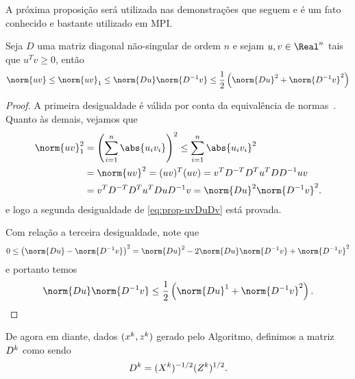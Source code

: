 
A próxima proposição será utilizada nas demonstrações que seguem e é um fato conhecido e bastante utilizado em \ac{MPI}.

\begin{prop}\label{prop:norm-uv}
	Seja $D$ uma matriz diagonal não-singular de ordem $n$ e sejam $u,v\in\Real^n$ tais que $u^Tv\geq0$, então 
	\begin{equation}
		\label{eq:prop-uvDuDv}
		\norm{uv}\leq \norm{uv}_1 \leq \norm{Du}\norm{D^{-1}v} \leq \frac{1}{2}\left(\norm{Du}^{2} + \norm{D^{-1}v}^{2}\right)
	\end{equation}
\end{prop}
\begin{proof} A primeira desigualdade é válida por conta da equivalência de normas~\cite[p.~53]{Golub:1996wp}. Quanto às demais, vejamos que 
\[
	\begin{aligned}
		\norm{uv}_1^{2} & = \left( \sum_{i=1}^{n}\abs{u_i v_i}  \right)^{2} \leq  \sum_{i=1}^{n}\abs{u_iv_i}^{2}\\
						& = \norm{uv}^{2} = (uv)^{T}(uv)  = v^{T}D^{-T}D^{T}u^{T}DD^{-1} uv\\
						& = v^{T}D^{-T}D^{T}u^{T}DuD^{-1}v = \norm{Du}^{2}\norm{D^{-1}v}^{2}.
	\end{aligned}
	\]
e logo a segunda desigualdade de \eqref{eq:prop-uvDuDv} está provada. 

Com relação a terceira desigualdade, note que  
\[
0 \leq \left(\norm{Du} - \norm{D^{-1}v}\right)^{2} = \norm{Du}^{2} - 2\norm{Du}\norm{D^{-1}v} + \norm{D^{-1}v}^{2}
\]
e portanto temos
\[
\norm{Du}\norm{D^{-1}v} \leq \frac{1}{2}\left(\norm{Du}^{1} + \norm{D^{-1}v}^{2}\right). \qedhere
\]
\end{proof}

De agora em diante, dados $(x^{k},z^{k})$ gerado pelo Algoritmo, definimos a matriz $D^{k}$ como sendo
\[
D^{k} =(X^{k})^{-1/2}(Z^{k})^{1/2}.
\]

